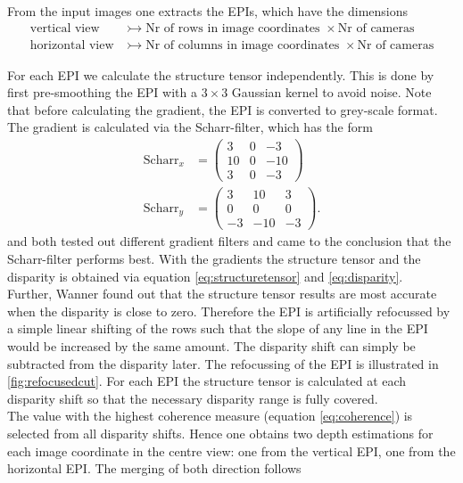 \documentclass  [
  paper    = a4,
  BCOR     = 10mm,
  twoside,
  fontsize = 12pt,
  fleqn,
  toc      = bibnumbered,
  toc      = listofnumbered,
  numbers  = noendperiod,
  headings = normal,
  listof   = leveldown,
  version  = 3.03
]                                       {scrreprt}
\begin{document}
 From the input images one extracts the EPIs, which have the dimensions
 \begin{align*}
 \text{vertical view}&\rightarrowtail \text{Nr of rows in image coordinates }\times \text{Nr of cameras}\\
 \text{horizontal view}&\rightarrowtail \text{Nr of columns in image coordinates }\times \text{Nr of cameras}
 \end{align*}
 
 For each EPI we calculate the structure tensor independently. This is done by first pre-smoothing the EPI with a $3\times3$ Gaussian kernel to avoid noise. Note that before calculating the gradient, the EPI is converted to grey-scale format.\\
 The gradient is calculated via the Scharr-filter, which has the form
 \begin{align}\label{key}
 \text{Scharr}_x &= \left(\begin{matrix}
 3&0&-3\\
 10&0&-10\\
 3&0&-3
 \end{matrix}\right)
\\
 \text{Scharr}_y &= \left(\begin{matrix}
 3&10&3\\
 0&0&0\\
 -3&-10&-3
 \end{matrix}\right).
 \end{align}
 \cite{wanner2014orientation} and \cite{diebold2016light} both tested out different gradient filters and came to the conclusion that the Scharr-filter performs best. With the gradients the structure tensor and the disparity is obtained via equation \ref{eq:structuretensor} and \ref{eq:disparity}.\\
 Further, Wanner found out that the structure tensor results are most accurate when the disparity is close to zero. Therefore the EPI is artificially refocussed by a simple linear shifting of the rows such that the slope of any line in the EPI would be increased by the same amount. The disparity shift can simply be subtracted from the disparity later. The refocussing of the EPI is illustrated in \ref{fig:refocusedcut}. For each EPI the structure tensor is calculated at each disparity shift so that the necessary disparity range is fully covered.  \\
The value with the highest coherence measure (equation \ref{eq:coherence}) is selected from all disparity shifts. Hence one obtains two depth estimations for each image coordinate in the centre view: one from the vertical EPI, one from the horizontal EPI. The merging of both direction follows
\end{document}
